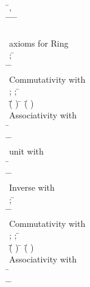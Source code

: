 \begin{hetcasl}
\> \Ax{\forall} \=,  \Ax{:}  \\
\> \Ax{\bullet} \=   \Ax{\Leftrightarrow} \=\Ax{\forall}  \Ax{:}  \Ax{\bullet} \=   \Ax{\Rightarrow} \=  \\
\> \\
\> {\small{}\KW{\%\%} axioms for Ring}\\
\> \Ax{\forall}  \Ax{:} ; \= \Ax{:}  \\
\> \Ax{\bullet} \= \Ax{+}  \Ax{=} \= \Ax{+} \\
\> {\small{}\KW{\%\%}Commutativity with \Ax{+}}\\
\> \Ax{\forall}  \Ax{:} ;  \Ax{:} ; \= \Ax{:}  \\
\> \Ax{\bullet} \=(\= \Ax{+} ) \Ax{+}  \Ax{=} \= \Ax{+} (\= \Ax{+} )\\
\> {\small{}\KW{\%\%}Associativity with \Ax{+}}\\
\> \Ax{\forall} \= \Ax{:}  \\
\> \Ax{\bullet} \= \Ax{+}  \Ax{=}  \Ax{\wedge} \= \Ax{+}  \Ax{=} \\
\> {\small{}\KW{\%\%}unit with \Ax{+}}\\
\> \Ax{\forall} \= \Ax{:}  \\
\> \Ax{\bullet} \=\Ax{\exists}  \Ax{:}  \Ax{\bullet} \= \Ax{+}  \Ax{=} \\
\> {\small{}\KW{\%\%}Inverse with \Ax{+}}\\
\> \Ax{\forall}  \Ax{:} ; \= \Ax{:}  \\
\> \Ax{\bullet} \= \Ax{*}  \Ax{=} \= \Ax{*} \\
\> {\small{}\KW{\%\%}Commutativity with \Ax{*}}\\
\> \Ax{\forall}  \Ax{:} ;  \Ax{:} ; \= \Ax{:}  \\
\> \Ax{\bullet} \=(\= \Ax{*} ) \Ax{*}  \Ax{=} \= \Ax{*} (\= \Ax{*} )\\
\> {\small{}\KW{\%\%}Associativity with \Ax{*}}\\
\> \Ax{\forall} \= \Ax{:}  \\
\> \Ax{\bullet} \= \Ax{*}  \Ax{=}  \Ax{\wedge} \= \Ax{*}  \Ax{=} \\

\end{hetcasl}

